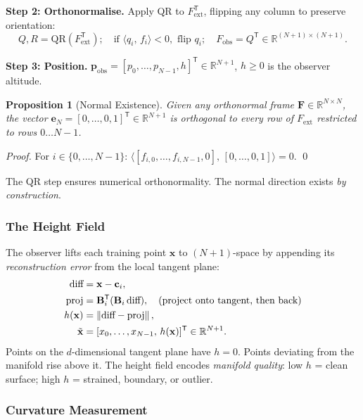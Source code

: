 \documentclass[12pt,letterpaper]{article}
\newtheorem{proposition}{Proposition}
\newcommand{\RR}{\mathbb{R}}
\newcommand{\bF}{\mathbf{F}}
\newcommand{\bp}{\mathbf{p}}
\newcommand{\bB}{\mathbf{B}}
\newcommand{\bx}{\mathbf{x}}
\newcommand{\bc}{\mathbf{c}}
\newcommand{\T}{\mathsf{T}}
\newcommand{\norm}[1]{\left\lVert#1\right\rVert}
\newcommand{\inner}[2]{\langle#1,\,#2\rangle}
\begin{document}
\textbf{Step 2: Orthonormalise.}  Apply QR to $F_\text{ext}^\T$, flipping any
column to preserve orientation:
\[
  Q,R = \mathrm{QR}(F_\text{ext}^\T); \quad
  \text{if } \inner{q_i}{f_i} < 0, \text{ flip } q_i; \quad
  F_\text{obs} = Q^\T \in \RR^{(N+1)\times(N+1)}.
\]

\textbf{Step 3: Position.}
$\bp_\text{obs} = [p_0,\ldots,p_{N-1},h]^\T \in \RR^{N+1}$,
$h \ge 0$ is the observer altitude.

\begin{proposition}[Normal Existence]
\label{prop:normal}
Given any orthonormal frame $\bF \in \RR^{N\times N}$, the vector
$\mathbf{e}_N = [0,\ldots,0,1]^\T \in \RR^{N+1}$ is orthogonal to every row of
$F_\text{ext}$ restricted to rows $0\ldots N{-}1$.
\end{proposition}
\begin{proof}
For $i \in \{0,\ldots,N{-}1\}$:
$\inner{[f_{i,0},\ldots,f_{i,N-1},0]}{[0,\ldots,0,1]} = 0$. \qed
\end{proof}

The QR step ensures numerical orthonormality.  The normal direction exists
\emph{by construction}.

\subsubsection{The Height Field}

The observer lifts each training point $\bx$ to $(N+1)$-space by appending its
\emph{reconstruction error} from the local tangent plane:
\begin{align}
  \text{diff} &= \bx - \bc_i, \notag\\
  \text{proj} &= \bB_i^\T(\bB_i\,\text{diff}), \quad\text{(project onto tangent, then back)}\notag\\
  h(\bx)      &= \norm{\text{diff} - \text{proj}}, \label{eq:height}\\
  \tilde{\bx} &= [x_0,\ldots,x_{N-1},\,h(\bx)]^\T \in \RR^{N+1}. \notag
\end{align}
Points on the $d$-dimensional tangent plane have $h=0$.  Points deviating from
the manifold rise above it.  The height field encodes \emph{manifold quality}:
low $h$ = clean surface; high $h$ = strained, boundary, or outlier.

\subsubsection{Curvature Measurement}
\end{document}
